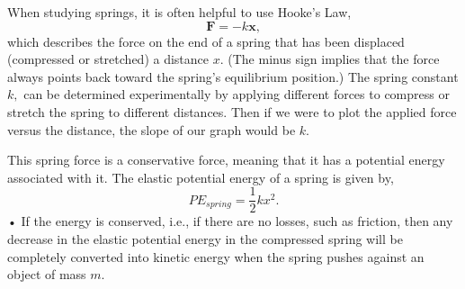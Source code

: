 \documentclass[main.tex]{subfiles}
\begin{document}
When studying springs, it is often helpful to use Hooke's Law,
\begin{equation}\label{eq:Hooke}
\mathbf{F}=-k\mathbf{x},
\end{equation}
which describes the force on the end of a spring that has been displaced (compressed or stretched) a distance $x.$ (The minus sign implies that the force always points back toward the spring's equilibrium position.) The spring constant $k,$ can be determined experimentally by applying different forces to compress or stretch the spring to different distances. Then if we were to plot the applied force versus the distance, the slope of our graph would be $k.$

This spring force is a conservative force, meaning that it has a potential energy associated with it. The elastic potential energy of a spring is given by,
\begin{equation}\label{eq:PE_Spring}
PE_{spring}=\frac{1}{2}kx^2.
\end{equation}•
If the energy is conserved, i.e., if there are no losses, such as friction, then any decrease in the elastic potential energy in the compressed spring will be completely converted into kinetic energy when the spring pushes against an object of mass $m.$
\end{document}

